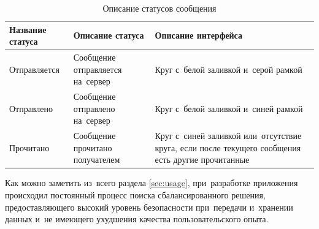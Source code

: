 \begin{table}[!ht]
  \caption{Описание статусов сообщения}
  \label{table:usage:dialogues:statusdesc}
  \centering
  \begin{tabularx}{\linewidth}{
    |>{\centering\hsize=0.75\hsize}X|
    >{\centering\hsize=1\hsize}X|
    >{\centering\arraybackslash\hsize=1.25\hsize}X|
  }
	\hline
	Название статуса & Описание статуса & Описание интерфейса \\

	\hline
	Отправляется & Сообщение отправляется на~сервер & Круг с~белой заливкой и~серой рамкой \\

	\hline
	Отправлено & Сообщение отправлено на~сервер & Круг с~белой заливкой и~синей рамкой \\

	\hline
	Прочитано & Сообщение прочитано получателем & Круг с~синей заливкой или~отсутствие круга, если после текущего сообщения есть другие прочитанные \\

	\hline
  \end{tabularx}
\end{table}

Как можно заметить из~всего раздела \ref{sec:usage}, при~разработке приложения происходил постоянный процесс поиска сбалансированного решения, предоставляющего высокий уровень безопасности при~передачи и~хранении данных и~не имеющего ухудшения качества пользовательского опыта.